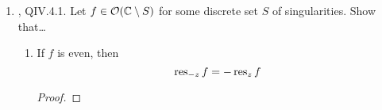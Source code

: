 \documentclass[../psets.tex]{subfiles}
\begin{document}
\begin{enumerate}[ref={A.\arabic*}]
\begin{proof}
        \begin{equation*}
            g(ib) = \frac{ib}{(2ib)^2} = \frac{1}{4ib}
        \end{equation*}
        and
        \begin{equation*}
            g'(ib) = \eval{\frac{(z+ib)^2\cdot 1-z\cdot 2(z+ib)}{(z+ib)^4}}_{z=ib}
            = \eval{\frac{ib-z}{(z+ib)^3}}_{z=ib}
            = 0
        \end{equation*}
        Thus,
        \begin{equation*}
            \frac{z}{(z+ib)^2} = g(z) = \frac{1}{4ib}+0(z-ib)+\cdots
        \end{equation*}
        It follows that
        \begin{equation*}
            \frac{z}{(z^2+b^2)^2} = (z-ib)^{-2}\cdot\left( \frac{1}{4ib}+0(z-ib)+\cdots \right)
            = \boxed{\frac{1}{4ib(z-ib)^2}}+\cdots
        \end{equation*}
        as desired.
    \end{proof}
    \item \textcite{bib:FischerLieb}, QIV.4.1. Let $f\in\mathcal{O}(\mathbb{C}\setminus S)$ for some discrete set $S$ of singularities. Show that\dots
    \begin{enumerate}
        \item If $f$ is even, then
        \begin{equation*}
            \operatorname{res}_{-z}f = -\operatorname{res}_zf
        \end{equation*}
        \begin{proof}

                


\end{proof}
\end{enumerate}
\end{enumerate}
\end{document}
